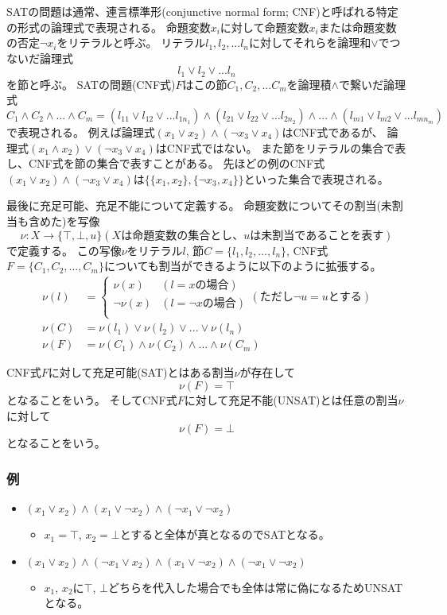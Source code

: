 \documentclass[titlepage]{jsarticle}
\begin{document}
SATの問題は通常、連言標準形(conjunctive normal form; CNF)と呼ばれる特定の形式の論理式で表現される。
命題変数$x_i$に対して命題変数$x_i$または命題変数の否定$\neg x_i$をリテラルと呼ぶ。
リテラル$l_1, l_2, ...l_n$に対してそれらを論理和$\lor$でつないだ論理式
\[
	l_1 \lor l_2 \lor ... l_n
\]
を節と呼ぶ。
SATの問題(CNF式)$F$はこの節$C_1, C_2, ...C_m$を論理積$\land$で繋いだ論理式
\[
	C_1 \land C_2 \land ... \land C_m = (l_{11} \lor l_{12} \lor ... l_{1n_1}) \land (l_{21} \lor l_{22} \lor ... l_{2n_2}) \land ... \land (l_{m1} \lor l_{m2} \lor ... l_{mn_m})
\]
で表現される。
例えば論理式$(x_1 \lor x_2) \land (\neg x_3 \lor x_4)$はCNF式であるが、
論理式$(x_1 \land x_2) \lor (\neg x_3 \lor x_4)$はCNF式ではない。
また節をリテラルの集合で表し、CNF式を節の集合で表すことがある。
先ほどの例のCNF式$(x_1 \lor x_2) \land (\neg x_3 \lor x_4)$は$\{\{x_1, x_2\}, \{\neg x_3, x_4\}\}$といった集合で表現される。

最後に充足可能、充足不能について定義する。
命題変数についてその割当(未割当も含めた)を写像
\[
	\nu: X \to \{\top, \bot, u\} (X{は命題変数の集合とし、}u{は未割当であることを表す})
\]
で定義する。
この写像$\nu$をリテラル$l$, 節$C=\{l_1, l_2, ..., l_n\}$, CNF式$F=\{C_1, C_2, ..., C_m\}$についても割当ができるように以下のように拡張する。
\begin{align*}
	\nu(l) & = 
	\begin{cases}
		\nu(x)     & (l= x{の場合}) \\
		\neg\nu(x) & (l=\neg x{の場合}) \\
	\end{cases}
	({ただし}\neg u = u{とする}) \\
	\nu(C) & = \nu(l_1) \lor  \nu(l_2) \lor  ... \lor  \nu(l_n) \\
	\nu(F) & = \nu(C_1) \land \nu(C_2) \land ... \land \nu(C_m)
\end{align*}

CNF式$F$に対して充足可能(SAT)とはある割当$\nu$が存在して
\[
	\nu(F) = \top
\]
となることをいう。
そしてCNF式$F$に対して充足不能(UNSAT)とは任意の割当$\nu$に対して
\[
	\nu(F) = \bot
\]
となることをいう。




\subsubsection{例}
\begin{itemize}
\item $(x_1 \lor x_2) \land (x_1 \lor \neg x_2) \land (\neg x_1 \lor \neg x_2)$
	\begin{itemize}
	\item $x_1=\top$, $x_2=\bot$とすると全体が真となるのでSATとなる。
	\end{itemize}
\item $(x_1 \lor x_2) \land (\neg x_1 \lor x_2) \land (x_1 \lor \neg x_2) \land (\neg x_1 \lor \neg x_2)$
	\begin{itemize}
	\item $x_1$, $x_2$に$\top$, $\bot$どちらを代入した場合でも全体は常に偽になるためUNSATとなる。
	\end{itemize}
\end{itemize}
\end{document}
